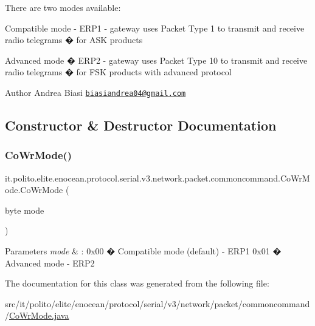 There are two modes available\+:
\begin{DoxyItemize}
\item Compatible mode -\/ E\+R\+P1 -\/ gateway uses Packet Type 1 to transmit and receive radio telegrams � for A\+SK products
\item Advanced mode � E\+R\+P2 -\/ gateway uses Packet Type 10 to transmit and receive radio telegrams � for F\+SK products with advanced protocol
\end{DoxyItemize}

\begin{DoxyAuthor}{Author}
Andrea Biasi \href{mailto:biasiandrea04@gmail.com}{\tt biasiandrea04@gmail.\+com} 
\end{DoxyAuthor}


\subsection{Constructor \& Destructor Documentation}
\hypertarget{classit_1_1polito_1_1elite_1_1enocean_1_1protocol_1_1serial_1_1v3_1_1network_1_1packet_1_1commoncommand_1_1_co_wr_mode_aa8cd9f7f4f657d51a7f342b4f2572e91}{}\label{classit_1_1polito_1_1elite_1_1enocean_1_1protocol_1_1serial_1_1v3_1_1network_1_1packet_1_1commoncommand_1_1_co_wr_mode_aa8cd9f7f4f657d51a7f342b4f2572e91} 
\subsubsection{\texorpdfstring{Co\+Wr\+Mode()}{CoWrMode()}}
{\footnotesize\ttfamily it.\+polito.\+elite.\+enocean.\+protocol.\+serial.\+v3.\+network.\+packet.\+commoncommand.\+Co\+Wr\+Mode.\+Co\+Wr\+Mode (\begin{DoxyParamCaption}\item[{byte}]{mode }\end{DoxyParamCaption})}


\begin{DoxyParams}{Parameters}
{\em mode} & \+: 0x00 � Compatible mode (default) -\/ E\+R\+P1 0x01 � Advanced mode -\/ E\+R\+P2 \\
\hline
\end{DoxyParams}


The documentation for this class was generated from the following file\+:\begin{DoxyCompactItemize}
\item 
src/it/polito/elite/enocean/protocol/serial/v3/network/packet/commoncommand/\hyperlink{_co_wr_mode_8java}{Co\+Wr\+Mode.\+java}\end{DoxyCompactItemize}
